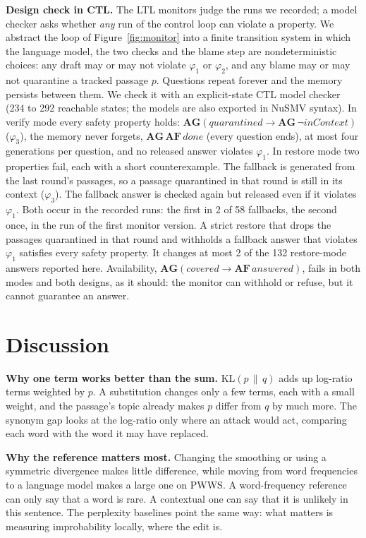 \documentclass[10pt,journal,compsoc]{IEEEtran}
\newcommand{\KL}{\mathrm{KL}}
\begin{document}
\textbf{Design check in CTL.} The LTL monitors judge the runs we recorded; a model checker asks whether \emph{any} run of the control loop can violate a property. We abstract the loop of Figure~\ref{fig:monitor} into a finite transition system in which the language model, the two checks and the blame step are nondeterministic choices: any draft may or may not violate $\varphi_1$ or $\varphi_2$, and any blame may or may not quarantine a tracked passage $p$. Questions repeat forever and the memory persists between them. We check it with an explicit-state CTL model checker (234 to 292 reachable states; the models are also exported in NuSMV syntax). In verify mode every safety property holds: $\mathbf{AG}(\mathit{quarantined}\rightarrow\mathbf{AG}\,\neg\mathit{inContext})$ ($\varphi_3$), the memory never forgets, $\mathbf{AG}\,\mathbf{AF}\,\mathit{done}$ (every question ends), at most four generations per question, and no released answer violates $\varphi_1$. In restore mode two properties fail, each with a short counterexample. The fallback is generated from the last round's passages, so a passage quarantined in that round is still in its context ($\varphi_3$). The fallback answer is checked again but released even if it violates $\varphi_1$. Both occur in the recorded runs: the first in 2 of 58 fallbacks, the second once, in the run of the first monitor version. A strict restore that drops the passages quarantined in that round and withholds a fallback answer that violates $\varphi_1$ satisfies every safety property. It changes at most 2 of the 132 restore-mode answers reported here. Availability, $\mathbf{AG}(\mathit{covered}\rightarrow\mathbf{AF}\,\mathit{answered})$, fails in both modes and both designs, as it should: the monitor can withhold or refuse, but it cannot guarantee an answer.

\section{Discussion}\label{sec:discussion}
\textbf{Why one term works better than the sum.} $\KL(p\,\|\,q)$ adds up log-ratio terms weighted by $p$. A substitution changes only a few terms, each with a small weight, and the passage's topic already makes $p$ differ from $q$ by much more. The synonym gap looks at the log-ratio only where an attack would act, comparing each word with the word it may have replaced.

\textbf{Why the reference matters most.} Changing the smoothing or using a symmetric divergence makes little difference, while moving from word frequencies to a language model makes a large one on PWWS. A word-frequency reference can only say that a word is rare. A contextual one can say that it is unlikely in this sentence. The perplexity baselines point the same way: what matters is measuring improbability locally, where the edit is.
\end{document}
